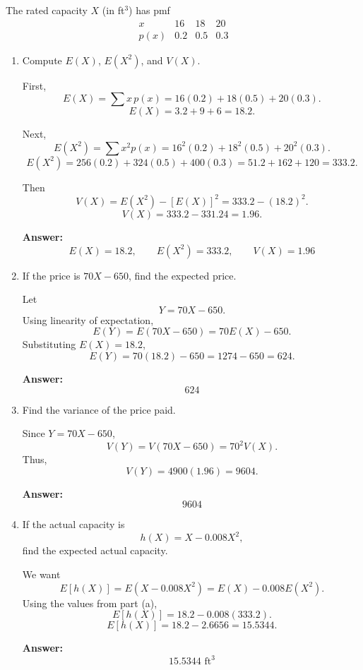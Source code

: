 \documentclass[11pt]{article}
\begin{document}
The rated capacity \(X\) (in ft\(^3\)) has pmf
\[
\begin{array}{c|ccc}
x & 16 & 18 & 20 \\ \hline
p(x) & 0.2 & 0.5 & 0.3
\end{array}
\]

\begin{enumerate}
    \item[(a)] Compute \(E(X)\), \(E(X^2)\), and \(V(X)\).

    First,
    \[
    E(X)=\sum x\,p(x)
    =16(0.2)+18(0.5)+20(0.3).
    \]
    \[
    E(X)=3.2+9+6=18.2.
    \]

    Next,
    \[
    E(X^2)=\sum x^2 p(x)
    =16^2(0.2)+18^2(0.5)+20^2(0.3).
    \]
    \[
    E(X^2)=256(0.2)+324(0.5)+400(0.3)
    =51.2+162+120=333.2.
    \]

    Then
    \[
    V(X)=E(X^2)-[E(X)]^2
    =333.2-(18.2)^2.
    \]
    \[
    V(X)=333.2-331.24=1.96.
    \]

    \textbf{Answer:}
    \[
    \boxed{E(X)=18.2,\qquad E(X^2)=333.2,\qquad V(X)=1.96}
    \]

    \item[(b)] If the price is \(70X-650\), find the expected price.

    Let
    \[
    Y=70X-650.
    \]
    Using linearity of expectation,
    \[
    E(Y)=E(70X-650)=70E(X)-650.
    \]
    Substituting \(E(X)=18.2\),
    \[
    E(Y)=70(18.2)-650=1274-650=624.
    \]

    \textbf{Answer:}
    \[
    \boxed{624}
    \]

    \item[(c)] Find the variance of the price paid.

    Since \(Y=70X-650\),
    \[
    V(Y)=V(70X-650)=70^2V(X).
    \]
    Thus,
    \[
    V(Y)=4900(1.96)=9604.
    \]

    \textbf{Answer:}
    \[
    \boxed{9604}
    \]

    \item[(d)] If the actual capacity is
    \[
    h(X)=X-0.008X^2,
    \]
    find the expected actual capacity.

    We want
    \[
    E[h(X)]=E(X-0.008X^2)=E(X)-0.008E(X^2).
    \]
    Using the values from part (a),
    \[
    E[h(X)]=18.2-0.008(333.2).
    \]
    \[
    E[h(X)]=18.2-2.6656=15.5344.
    \]

    \textbf{Answer:}
    \[
    \boxed{15.5344\text{ ft}^3}
    \]
\end{enumerate}
\end{document}
